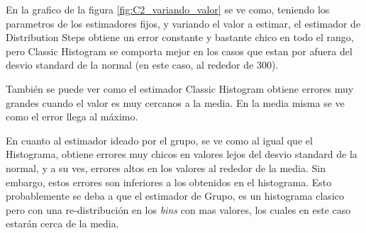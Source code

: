 \documentclass[10pt, a4paper]{article}
\begin{document}
		En la grafico de la figura \ref{fig:C2_variando_valor} se ve como, teniendo los parametros de los estimadores fijos, y variando el valor a estimar, el estimador de Distribution Steps obtiene un error constante y bastante chico en todo el rango, pero Classic Histogram se comporta mejor en los casos que estan por afuera del desvio standard de la normal (en este caso, al rededor de 300).
		
		Tambi\'en se puede ver como el estimador Classic Histogram obtiene errores muy grandes cuando el valor es muy cercanos a la media. En la media misma se ve como el error llega al m\'aximo.
		
		En cuanto al estimador ideado por el grupo, se ve como al igual que el Histograma, obtiene errores muy chicos en valores lejos del desvio standard de la normal, y a su ves, errores altos en los valores al rededor de la media. Sin embargo, estos errores son inferiores a los obtenidos en el histograma. Esto probablemente se deba a que el estimador de Grupo, es un histograma clasico pero con una re-distribuci\'on en los \textit{bins} con mas valores, los cuales en este caso estarán cerca de la media.
	
		
\end{document}
